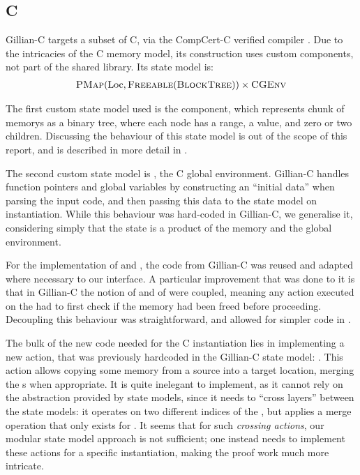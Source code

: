 \subsection{C}

Gillian-C \cite{gillian0} targets a subset of C, via the CompCert-C verified compiler \cite{compcert}. Due to the intricacies of the C memory model, its construction uses custom components, not part of the shared library. Its state model is: \begin{align*}
	\textsc{PMap}(\text{Loc}, \textsc{Freeable}(\textsc{BlockTree})) \times \textsc{CGEnv}
\end{align*}

The first custom state model used is the \BlockTree{} component, which represents chunk of memorys as a binary tree, where each node has a range, a value, and zero or two children. Discussing the behaviour of this state model is out of the scope of this report, and is described in more detail in \cite{sacha-phd}.

The second custom state model is \CGEnv{}, the C global environment. Gillian-C handles function pointers and global variables by constructing an ``initial data'' when parsing the input code, and then passing this data to the state model on instantiation. While this behaviour was hard-coded in Gillian-C, we generalise it, considering simply that the state is a product of the memory and the global environment.

For the implementation of \BlockTree{} and \CGEnv, the code from Gillian-C was reused and adapted where necessary to our interface. A particular improvement that was done to it is that in Gillian-C the notion of \Freeable{} and of \BlockTree{} were coupled, meaning any action executed on the \BlockTree{} had to first check if the memory had been freed before proceeding. Decoupling this behaviour was straightforward, and allowed for simpler code in \BlockTree.

The bulk of the new code needed for the C instantiation lies in implementing a new action, that was previously hardcoded in the Gillian-C state model: . This action allows copying some memory from a source into a target location, merging the \BlockTree{}s when appropriate. It is quite inelegant to implement, as it cannot rely on the abstraction provided by state models, since it needs to ``cross layers'' between the state models: it operates on two different indices of the \PMap, but applies a merge operation that only exists for \BlockTree. It seems that for such \emph{crossing actions}, our modular state model approach is not sufficient; one instead needs to implement these actions for a specific instantiation, making the proof work much more intricate.

